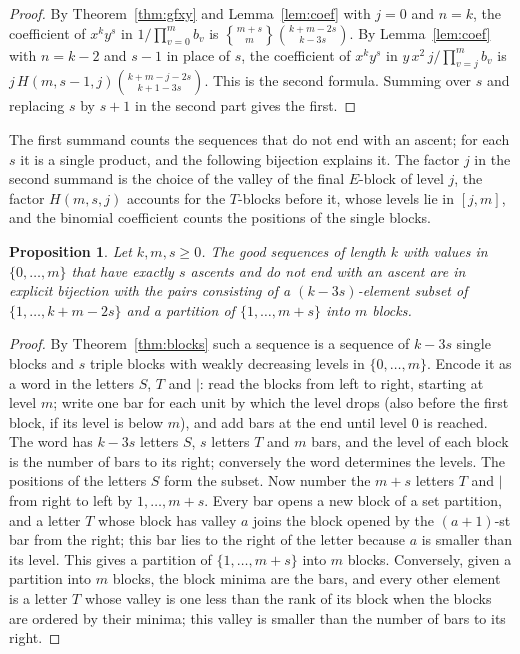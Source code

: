 \documentclass[11pt]{amsart}
\newtheorem{proposition}[theorem]{Proposition}
\theoremstyle{definition}
\newcommand{\stirling}[2]{\genfrac{\{}{\}}{0pt}{}{#1}{#2}}
\begin{document}
\begin{proof}
By Theorem~\ref{thm:gfxy} and Lemma~\ref{lem:coef} with $j=0$ and $n=k$, the coefficient of $x^ky^s$ in $1/\prod_{v=0}^mb_v$ is $\stirling{m+s}{m}\binom{k+m-2s}{k-3s}$. By Lemma~\ref{lem:coef} with $n=k-2$ and $s-1$ in place of $s$, the coefficient of $x^ky^s$ in $y\,x^2\,j/\prod_{v=j}^mb_v$ is $j\,H(m,s-1,j)\binom{k+m-j-2s}{k+1-3s}$. This is the second formula. Summing over $s$ and replacing $s$ by $s+1$ in the second part gives the first.
\end{proof}

The first summand counts the sequences that do not end with an ascent; for each $s$ it is a single product, and the following bijection explains it. The factor $j$ in the second summand is the choice of the valley of the final $E$-block of level $j$, the factor $H(m,s,j)$ accounts for the $T$-blocks before it, whose levels lie in $[j,m]$, and the binomial coefficient counts the positions of the single blocks.

\begin{proposition}\label{prop:bijection}
Let $k,m,s\ge0$. The good sequences of length $k$ with values in $\{0,\dots,m\}$ that have exactly $s$ ascents and do not end with an ascent are in explicit bijection with the pairs consisting of a $(k-3s)$-element subset of $\{1,\dots,k+m-2s\}$ and a partition of $\{1,\dots,m+s\}$ into $m$ blocks.
\end{proposition}

\begin{proof}
By Theorem~\ref{thm:blocks} such a sequence is a sequence of $k-3s$ single blocks and $s$ triple blocks with weakly decreasing levels in $\{0,\dots,m\}$. Encode it as a word in the letters $S$, $T$ and $|$: read the blocks from left to right, starting at level $m$; write one bar for each unit by which the level drops (also before the first block, if its level is below $m$), and add bars at the end until level $0$ is reached. The word has $k-3s$ letters $S$, $s$ letters $T$ and $m$ bars, and the level of each block is the number of bars to its right; conversely the word determines the levels. The positions of the letters $S$ form the subset. Now number the $m+s$ letters $T$ and $|$ from right to left by $1,\dots,m+s$. Every bar opens a new block of a set partition, and a letter $T$ whose block has valley $a$ joins the block opened by the $(a+1)$-st bar from the right; this bar lies to the right of the letter because $a$ is smaller than its level. This gives a partition of $\{1,\dots,m+s\}$ into $m$ blocks. Conversely, given a partition into $m$ blocks, the block minima are the bars, and every other element is a letter $T$ whose valley is one less than the rank of its block when the blocks are ordered by their minima; this valley is smaller than the number of bars to its right.
\end{proof}
\end{document}
